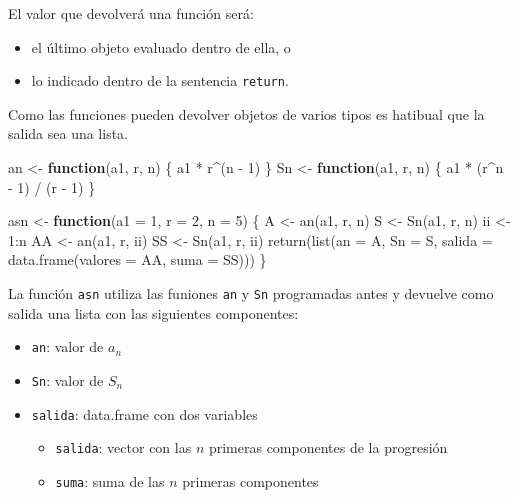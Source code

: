 \documentclass[
]{book}
\newenvironment{Shaded}{\begin{snugshade}}{\end{snugshade}}
\newcommand{\AttributeTok}[1]{\textcolor[rgb]{0.77,0.63,0.00}{#1}}
\newcommand{\ControlFlowTok}[1]{\textcolor[rgb]{0.13,0.29,0.53}{\textbf{#1}}}
\newcommand{\DecValTok}[1]{\textcolor[rgb]{0.00,0.00,0.81}{#1}}
\newcommand{\FunctionTok}[1]{\textcolor[rgb]{0.00,0.00,0.00}{#1}}
\newcommand{\NormalTok}[1]{#1}
\newcommand{\OtherTok}[1]{\textcolor[rgb]{0.56,0.35,0.01}{#1}}
\newcommand{\SpecialCharTok}[1]{\textcolor[rgb]{0.00,0.00,0.00}{#1}}
\providecommand{\tightlist}{%
  \setlength{\itemsep}{0pt}\setlength{\parskip}{0pt}}
\theoremstyle{break}
\theoremstyle{nonumberplain}
\begin{document}
El valor que devolverá una función será:

\begin{itemize}
\item
  el último objeto evaluado dentro de ella, o
\item
  lo indicado dentro de la sentencia \texttt{return}.
\end{itemize}

Como las funciones pueden devolver objetos de varios tipos es hatibual
que la salida sea una lista.

\begin{Shaded}
\begin{Highlighting}[]
\NormalTok{an }\OtherTok{\textless{}{-}} \ControlFlowTok{function}\NormalTok{(a1, r, n) \{ a1 }\SpecialCharTok{*}\NormalTok{ r}\SpecialCharTok{\^{}}\NormalTok{(n }\SpecialCharTok{{-}} \DecValTok{1}\NormalTok{) \}}
\NormalTok{Sn }\OtherTok{\textless{}{-}} \ControlFlowTok{function}\NormalTok{(a1, r, n) \{ a1 }\SpecialCharTok{*}\NormalTok{ (r}\SpecialCharTok{\^{}}\NormalTok{n }\SpecialCharTok{{-}} \DecValTok{1}\NormalTok{) }\SpecialCharTok{/}\NormalTok{ (r }\SpecialCharTok{{-}} \DecValTok{1}\NormalTok{) \}}
  
\NormalTok{asn }\OtherTok{\textless{}{-}} \ControlFlowTok{function}\NormalTok{(}\AttributeTok{a1 =} \DecValTok{1}\NormalTok{, }\AttributeTok{r =} \DecValTok{2}\NormalTok{, }\AttributeTok{n =} \DecValTok{5}\NormalTok{) \{}
\NormalTok{  A }\OtherTok{\textless{}{-}} \FunctionTok{an}\NormalTok{(a1, r, n)}
\NormalTok{  S }\OtherTok{\textless{}{-}} \FunctionTok{Sn}\NormalTok{(a1, r, n)}
\NormalTok{  ii }\OtherTok{\textless{}{-}} \DecValTok{1}\SpecialCharTok{:}\NormalTok{n}
\NormalTok{  AA }\OtherTok{\textless{}{-}} \FunctionTok{an}\NormalTok{(a1, r, ii)}
\NormalTok{  SS }\OtherTok{\textless{}{-}} \FunctionTok{Sn}\NormalTok{(a1, r, ii)}
  \FunctionTok{return}\NormalTok{(}\FunctionTok{list}\NormalTok{(}\AttributeTok{an =}\NormalTok{ A, }\AttributeTok{Sn =}\NormalTok{ S, }\AttributeTok{salida =} \FunctionTok{data.frame}\NormalTok{(}\AttributeTok{valores =}\NormalTok{ AA, }\AttributeTok{suma =}\NormalTok{ SS)))}
\NormalTok{\}}
\end{Highlighting}
\end{Shaded}

La función \texttt{asn} utiliza las funiones \texttt{an} y \texttt{Sn}
programadas antes y devuelve como salida una lista con las siguientes
componentes:

\begin{itemize}
\tightlist
\item
  \texttt{an}: valor de \(a_n\)
\item
  \texttt{Sn}: valor de \(S_n\)
\item
  \texttt{salida}: data.frame con dos variables

  \begin{itemize}
  \tightlist
  \item
    \texttt{salida}: vector con las \(n\) primeras componentes de la
    progresión
  \item
    \texttt{suma}: suma de las \(n\) primeras componentes
  \end{itemize}
\end{itemize}
\end{document}

